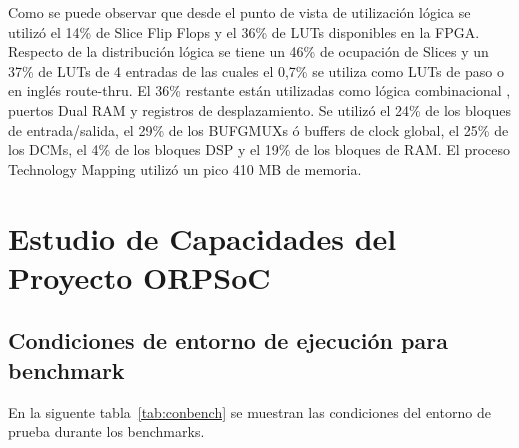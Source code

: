 	Como se puede observar que desde el punto de vista de utilización lógica se utilizó el 14\% de Slice Flip Flops y el 36\% de LUTs disponibles en
	la FPGA. Respecto de la distribución lógica se tiene un 46\% de ocupación de Slices y un 37\% de LUTs de 4 entradas de las cuales el 0,7\% se utiliza
	como LUTs de paso o en inglés route-thru. El 36\% restante están utilizadas como lógica combinacional , puertos Dual RAM y registros de
	desplazamiento. Se utilizó el 24\% de los bloques de entrada/salida, el 29\% de los BUFGMUXs ó buffers de clock global, el 25\% de los DCMs, el 4\%
	de los bloques DSP y el 19\% de los bloques de RAM. El proceso Technology Mapping utilizó un pico 410 MB de memoria.  

%
%
%
%

		
\section {Estudio de Capacidades del Proyecto ORPSoC}	
		\subsection{Condiciones de entorno de ejecución para benchmark}
		
		En la siguente tabla~\ref{tab:conbench} se muestran las condiciones del entorno de prueba durante los benchmarks.  

